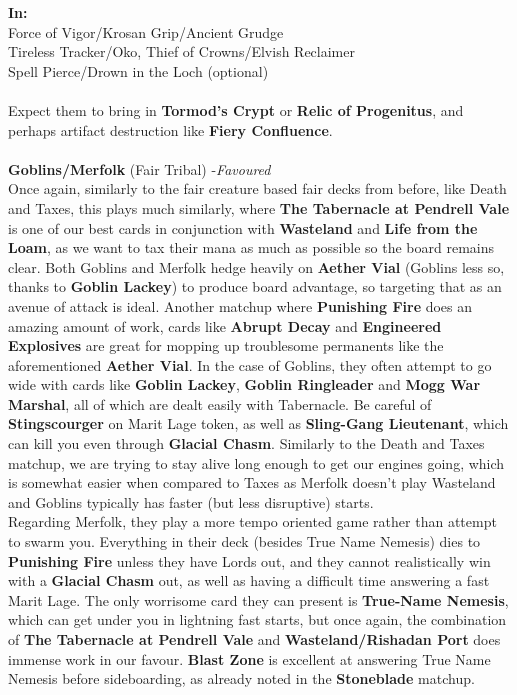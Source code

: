 \documentclass{report}
\begin{document}
\textbf{In:}\\
Force of Vigor/Krosan Grip/Ancient Grudge\\Tireless Tracker/Oko, Thief of Crowns/Elvish Reclaimer\\Spell Pierce/Drown in the Loch (optional)\\\\
Expect them to bring in \textbf{Tormod's Crypt} or \textbf{Relic of Progenitus}, and perhaps artifact destruction like \textbf{Fiery Confluence}.\\\\
\textbf{Goblins/Merfolk} (Fair Tribal) -\emph{Favoured}\\
Once again, similarly to the fair creature based fair decks from before, like Death and Taxes, this plays much similarly, where \textbf{The Tabernacle at Pendrell Vale} is one of our best cards in conjunction with \textbf{Wasteland} and \textbf{Life from the Loam}, as we want to tax their mana as much as possible so the board remains clear. Both Goblins and Merfolk hedge heavily on \textbf{Aether Vial} (Goblins less so, thanks to \textbf{Goblin Lackey}) to produce board advantage, so targeting that as an avenue of attack is ideal. Another matchup where \textbf{Punishing Fire} does an amazing amount of work, cards like \textbf{Abrupt Decay} and \textbf{Engineered Explosives} are great for mopping up troublesome permanents like the aforementioned \textbf{Aether Vial}. In the case of Goblins, they often attempt to go wide with cards like \textbf{Goblin Lackey}, \textbf{Goblin Ringleader} and \textbf{Mogg War Marshal}, all of which are dealt easily with Tabernacle. Be careful of \textbf{Stingscourger} on Marit Lage token, as well as \textbf{Sling-Gang Lieutenant}, which can kill you even through \textbf{Glacial Chasm}. Similarly to the Death and Taxes matchup, we are trying to stay alive long enough to get our engines going, which is somewhat easier when compared to Taxes as Merfolk doesn't play Wasteland and Goblins typically has faster (but less disruptive) starts.\\
Regarding Merfolk, they play a more tempo oriented game rather than attempt to swarm you. Everything in their deck (besides True Name Nemesis) dies to \textbf{Punishing Fire} unless they have Lords out, and they cannot realistically win with a \textbf{Glacial Chasm} out, as well as having a difficult time answering a fast Marit Lage. The only worrisome card they can present is \textbf{True-Name Nemesis}, which can get under you in lightning fast starts, but once again, the combination of \textbf{The Tabernacle at Pendrell Vale} and \textbf{Wasteland/Rishadan Port} does immense work in our favour. \textbf{Blast Zone} is excellent at answering True Name Nemesis before sideboarding, as already noted in the \textbf{Stoneblade} matchup.\\
\end{document}
